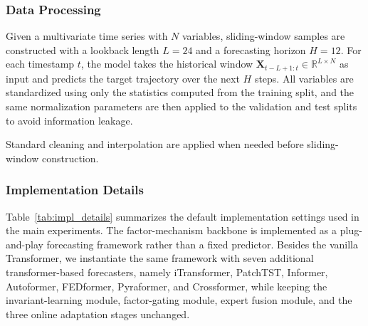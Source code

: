 ﻿\documentclass[journal]{IEEEtran}
\newenvironment{auditproblemblock}{\begingroup\color{red}}{\endgroup}
\begin{document}
\begin{auditproblemblock}
\subsubsection{Data Processing}
Given a multivariate time series with $N$ variables, sliding-window samples are constructed with a lookback length $L=24$ and a forecasting horizon $H=12$. For each timestamp $t$, the model takes the historical window $\mathbf{X}_{t-L+1:t}\in\mathbb{R}^{L\times N}$ as input and predicts the target trajectory over the next $H$ steps. All variables are standardized using only the statistics computed from the training split, and the same normalization parameters are then applied to the validation and test splits to avoid information leakage.

Standard cleaning and interpolation are applied when needed before sliding-window construction.

\subsubsection{Implementation Details}
Table~\ref{tab:impl_details} summarizes the default implementation settings used in the main experiments. The factor-mechanism backbone is implemented as a plug-and-play forecasting framework rather than a fixed predictor. Besides the vanilla Transformer, we instantiate the same framework with seven additional transformer-based forecasters, namely iTransformer, PatchTST, Informer, Autoformer, FEDformer, Pyraformer, and Crossformer, while keeping the invariant-learning module, factor-gating module, expert fusion module, and the three online adaptation stages unchanged.


\end{auditproblemblock}
\end{document}

